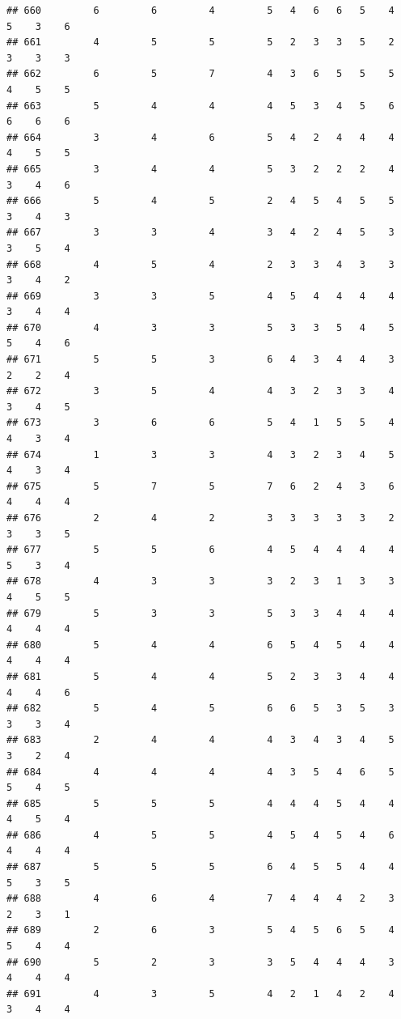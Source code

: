 \documentclass[
]{article}
\begin{document}
\begin{verbatim}
## 660         6         6         4         5   4   6   6   5    4    5    3    6
## 661         4         5         5         5   2   3   3   5    2    3    3    3
## 662         6         5         7         4   3   6   5   5    5    4    5    5
## 663         5         4         4         4   5   3   4   5    6    6    6    6
## 664         3         4         6         5   4   2   4   4    4    4    5    5
## 665         3         4         4         5   3   2   2   2    4    3    4    6
## 666         5         4         5         2   4   5   4   5    5    3    4    3
## 667         3         3         4         3   4   2   4   5    3    3    5    4
## 668         4         5         4         2   3   3   4   3    3    3    4    2
## 669         3         3         5         4   5   4   4   4    4    3    4    4
## 670         4         3         3         5   3   3   5   4    5    5    4    6
## 671         5         5         3         6   4   3   4   4    3    2    2    4
## 672         3         5         4         4   3   2   3   3    4    3    4    5
## 673         3         6         6         5   4   1   5   5    4    4    3    4
## 674         1         3         3         4   3   2   3   4    5    4    3    4
## 675         5         7         5         7   6   2   4   3    6    4    4    4
## 676         2         4         2         3   3   3   3   3    2    3    3    5
## 677         5         5         6         4   5   4   4   4    4    5    3    4
## 678         4         3         3         3   2   3   1   3    3    4    5    5
## 679         5         3         3         5   3   3   4   4    4    4    4    4
## 680         5         4         4         6   5   4   5   4    4    4    4    4
## 681         5         4         4         5   2   3   3   4    4    4    4    6
## 682         5         4         5         6   6   5   3   5    3    3    3    4
## 683         2         4         4         4   3   4   3   4    5    3    2    4
## 684         4         4         4         4   3   5   4   6    5    5    4    5
## 685         5         5         5         4   4   4   5   4    4    4    5    4
## 686         4         5         5         4   5   4   5   4    6    4    4    4
## 687         5         5         5         6   4   5   5   4    4    5    3    5
## 688         4         6         4         7   4   4   4   2    3    2    3    1
## 689         2         6         3         5   4   5   6   5    4    5    4    4
## 690         5         2         3         3   5   4   4   4    3    4    4    4
## 691         4         3         5         4   2   1   4   2    4    3    4    4

\end{verbatim}
\end{document}
